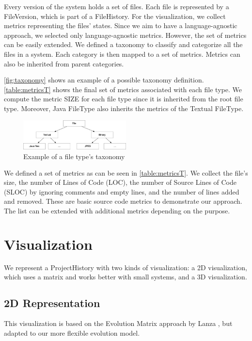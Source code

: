 Every version of the system holds a set of files. 
Each file is represented by a FileVersion, which is part of a FileHistory.
For the visualization, we collect metrics representing the files' states.
Since we aim to have a language-agnostic approach, we selected only language-agnostic metrics. 
However, the set of metrics can be easily extended.
We defined a taxonomy to classify and categorize all the files in a system. 
Each category is then mapped to a set of metrics. Metrics can also be inherited from parent categories. 

\autoref{fig:taxonomy} shows an example of a possible taxonomy definition. \autoref{table:metricsT} shows the final set of metrics associated with each file type. We compute the metric SIZE for each file type since it is inherited from the root file type. Moreover, Java FileType also inherits the metrics of the Textual FileType.  

\begin{figure}[ht]
    \centering
    \includegraphics[width=0.5\textwidth]{Taxonomy.jpg}
    \caption{Example of a file type's taxonomy}
    \label{fig:taxonomy}
\end{figure}



We defined a set of metrics as can be seen in \autoref{table:metricsT}. We collect the file's size, the number of Lines of Code (LOC), the number of Source Lines of Code (SLOC) by ignoring comments and empty lines, and the number of lines added and removed. These are basic source code metrics to demonstrate our approach. The list can be extended with additional metrics depending on the purpose.


\section{Visualization}
We represent a ProjectHistory with two kinds of visualization: a 2D visualization, which uses a matrix and works better with small systems, and a 3D visualization. 


\subsection{2D Representation}
This visualization is based on the Evolution Matrix approach by Lanza \cite{Lanza2001}, but adapted to our more flexible evolution model.

